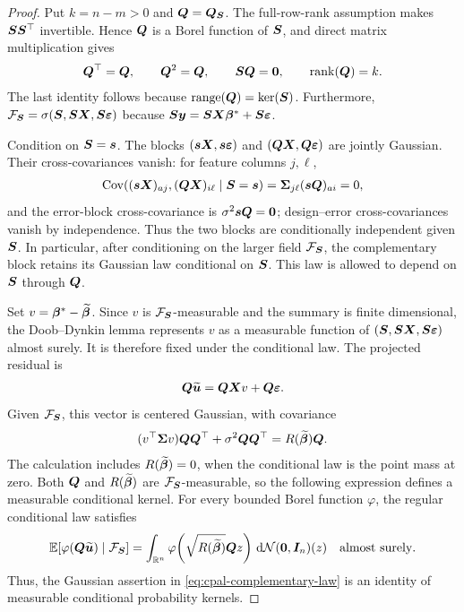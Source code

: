 \documentclass{article}
\theoremstyle{plain} %
\theoremstyle{definition} %
\theoremstyle{definition} %
\begin{document}
\begin{proof}
Put $k=n-m>0$ and $\boldsymbol{Q}=\boldsymbol{Q}_{\boldsymbol{S}}$. The full-row-rank
assumption makes $\boldsymbol{S}\boldsymbol{S}^\top$ invertible. Hence $\boldsymbol{Q}$ is a Borel
function of $\boldsymbol{S}$, and direct matrix multiplication gives
\begin{align*}
    \boldsymbol{Q}^\top=\boldsymbol{Q},\qquad \boldsymbol{Q}^2=\boldsymbol{Q},\qquad
    \boldsymbol{S}\boldsymbol{Q}=\mathbf{0},\qquad \operatorname{rank}(\boldsymbol{Q})=k.
\end{align*}
The last identity follows because $\operatorname{range}(\boldsymbol{Q})=\ker(\boldsymbol{S})$.
     Furthermore, ${\mathcal F}_{\boldsymbol{S}}=\sigma(\boldsymbol{S},\boldsymbol{S}\boldsymbol{X},\boldsymbol{S}{\boldsymbol{\varepsilon} })$ because
$\boldsymbol{S}\boldsymbol{y}=\boldsymbol{S}\boldsymbol{X}\boldsymbol{\beta}^*+\boldsymbol{S}{\boldsymbol{\varepsilon} }$. 

Condition on $\boldsymbol{S}=\boldsymbol{s}$. The blocks
$(\boldsymbol{s}\boldsymbol{X},\boldsymbol{s}{\boldsymbol{\varepsilon} })$ and $(\boldsymbol{Q}\boldsymbol{X},\boldsymbol{Q}{\boldsymbol{\varepsilon} })$ are jointly Gaussian.
Their cross-covariances vanish: for feature columns $j,\ell$,
\begin{align*}
    \operatorname{Cov}\!\left(
      (\boldsymbol{s}\boldsymbol{X})_{aj},(\boldsymbol{Q}\boldsymbol{X})_{i\ell}\mid\boldsymbol{S}=\boldsymbol{s}
    \right)
    =\boldsymbol{\Sigma}_{j\ell}(\boldsymbol{s}\boldsymbol{Q})_{ai}=0,
\end{align*}
and the error-block cross-covariance is
$\sigma^2\boldsymbol{s}\boldsymbol{Q}=\mathbf{0}$; design--error cross-covariances vanish by
independence. Thus the two blocks are conditionally independent given
$\boldsymbol{S}$. In particular, after conditioning on the larger field
${\mathcal F}_{\boldsymbol{S}}$, the complementary block retains its Gaussian law
conditional on $\boldsymbol{S}$. This law is allowed to depend on $\boldsymbol{S}$ through
$\boldsymbol{Q}$.

Set $v=\boldsymbol{\beta}^*-\widetilde{\boldsymbol{\beta}}$. Since $v$ is
${\mathcal F}_{\boldsymbol{S}}$-measurable and the summary is finite dimensional, the
Doob--Dynkin lemma represents $v$ as a measurable function of
$(\boldsymbol{S},\boldsymbol{S}\boldsymbol{X},\boldsymbol{S}{\boldsymbol{\varepsilon} })$ almost surely. It is therefore fixed under the
conditional law. The projected residual is
\begin{align*}
    \boldsymbol{Q}\widetilde{\boldsymbol{u}}=\boldsymbol{Q}\boldsymbol{X} v+\boldsymbol{Q}{\boldsymbol{\varepsilon} }.
\end{align*}
Given ${\mathcal F}_{\boldsymbol{S}}$, this vector is centered Gaussian, with covariance
\begin{align*}
    (v^\top\boldsymbol{\Sigma} v)\boldsymbol{Q}\boldsymbol{Q}^\top
       +\sigma^2\boldsymbol{Q}\boldsymbol{Q}^\top
    =R(\widetilde{\boldsymbol{\beta}})\boldsymbol{Q}.
\end{align*}
The calculation includes $R(\widetilde{\boldsymbol{\beta}})=0$, when the conditional
law is the point mass at zero. Both $\boldsymbol{Q}$ and $R(\widetilde{\boldsymbol{\beta}})$ are
${\mathcal F}_{\boldsymbol{S}}$-measurable, so the following expression defines a measurable
conditional kernel. For every bounded Borel
function $\varphi$, the regular conditional law satisfies
\begin{align*}
    {\mathbb{E}}[\varphi(\boldsymbol{Q}\widetilde{\boldsymbol{u}})\mid{\mathcal F}_{\boldsymbol{S}}]
    =\int_{{\mathbb{R}}^n}
      \varphi\!\left(\sqrt{R(\widetilde{\boldsymbol{\beta}})}
        \boldsymbol{Q} z\right)\,\mathrm d{\mathcal N}(\mathbf{0},\boldsymbol{I}_n)(z)
    \quad\text{almost surely}.
\end{align*}
Thus, the Gaussian assertion in \eqref{eq:cpal-complementary-law} is an
identity of measurable conditional probability kernels.


\end{proof}
\end{document}
